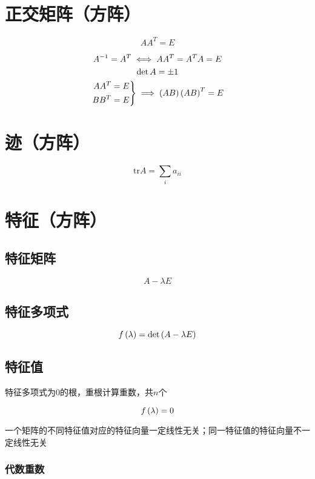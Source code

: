 \documentclass{article}
\begin{document}
\section{正交矩阵（方阵）}

\begin{definition}
    \[AA^T=E\]
\end{definition}

\[\begin{gathered}
        A^{-1}=A^T\iff AA^T=A^TA=E\\
        \det A=\pm 1\\
        \left.\begin{aligned}
            AA^T & =E \\
            BB^T & =E
        \end{aligned}\right\}\implies\left(AB\right)\left(AB\right)^T=E
    \end{gathered}\]

\section{迹（方阵）}

\[\mathrm{tr}A=\sum_ia_{ii}\]

\section{特征（方阵）}

\subsection{特征矩阵}

\[A-\lambda E\]

\subsection{特征多项式}

\[f\left(\lambda\right)=\det\left(A-\lambda E\right)\]

\subsection{特征值}

特征多项式为$0$的根，重根计算重数，共$n$个

\[f\left(\lambda\right)=0\]

一个矩阵的不同特征值对应的特征向量一定线性无关；同一特征值的特征向量不一定线性无关

\subsubsection{代数重数}
\end{document}
